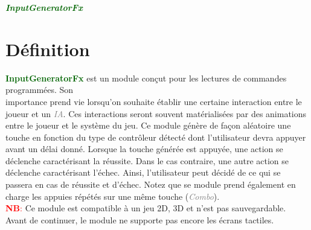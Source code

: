 \documentclass[a4paper, 11pt]{article}
\begin{document}
	\pagecolor{silver}
	\huge{\hspace{12.5cm}\textit{\textbf{\textcolor{darkgreen}{InputGeneratorFx}}}}\large{} \tableofcontents 
	\newpage
	\section{Définition}
	\textcolor{darkgreen}{\textbf{InputGeneratorFx}} est un module conçut pour les lectures de commandes 
	programmées. Son \\importance prend vie lorsqu'on souhaite établir une certaine interaction entre le 
	joueur et un \textcolor{gray}{\textit{IA}}. Ces interactions seront souvent matérialisées par des 
	animations entre le joueur et le système du jeu. Ce module génère de façon aléatoire une touche en 
	fonction du type de contrôleur détecté dont l'utilisateur devra appuyer avant un délai donné. Lorsque la 
	touche générée est appuyée, une action se déclenche caractérisant la réussite. Dans le cas contraire, 
	une autre action se déclenche caractérisant l'échec. Ainsi, l'utilisateur peut décidé de ce qui se 
	passera en cas de réussite et d'échec. Notez que se module prend également en charge les appuies répétés 
	sur une même touche (\textcolor{gray}{\textit{Combo}}).\\
	\textcolor{red}{\textbf{NB}:} Ce module est compatible à un jeu 2D, 3D et n'est pas sauvegardable. Avant 
	de continuer, le module ne supporte pas encore les écrans tactiles.

\end{document}
